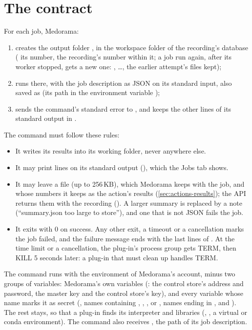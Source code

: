 \section{The contract}
\label{sec:actions-contract}

For each job, Medorama:
\begin{enumerate}
\item creates the output folder
  , in the workspace folder of the
  recording's database ( its number,  the recording's number within it; a job
  run again, after its worker stopped, gets a new one: ,  \dots,
  the earlier attempt's files kept);
\item runs  there, with the job description as JSON on its standard input, also
  saved as  (its path in the environment variable );
\item sends the command's standard error to , and keeps the other lines of its
  standard output in .
\end{enumerate}

The command must follow these rules:
\begin{itemize}
\item It writes its results into its working folder, never anywhere else.
\item It may print  lines on its standard output (),
  which the Jobs tab shows.
\item It may leave a  file (up to 256\,KB), which Medorama keeps with the job,
  and whose numbers it keeps as the action's results (\cref{sec:actions-results}); the API
  returns them with the recording (). A larger summary is replaced by
  a note (``summary.json too large to store''), and one that is not JSON fails the job.
\item It exits with 0 on success. Any other exit, a timeout or a cancellation marks the job
  failed, and the failure message ends with the last lines of . At the time limit
  or a cancellation, the plug-in's process group gets TERM, then KILL 5 seconds later: a plug-in
  that must clean up handles TERM.
\end{itemize}

The command runs with the environment of Medorama's account, minus two groups of variables:
Medorama's own variables (: the control store's address and password, the
master key and the control store's key), and every variable whose name marks it as secret (, names
containing , , ,  or
, names ending in , and ). The rest stays, so
that a plug-in finds its interpreter and libraries (, , a virtual or conda
environment). The command also receives , the path of its job description.

